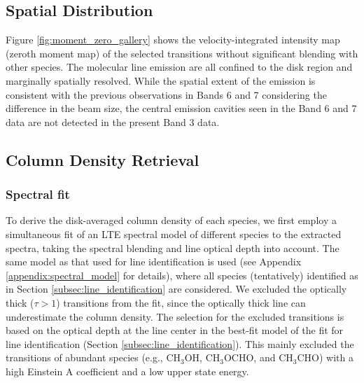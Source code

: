 \documentclass[linenumbers, twocolumn, twocolappendix, astrosymb, times]{aastex631}
\newcommand{\methanol}{CH$_3$OH\xspace}
\newcommand{\acetaldehyde}{CH$_3$CHO\xspace}
\newcommand{\methylformate}{CH$_3$OCHO\xspace}
\begin{document}



\subsection{Spatial Distribution}
Figure \ref{fig:moment_zero_gallery} shows the velocity-integrated intensity map (zeroth moment map) of the selected transitions without significant blending with other species. The molecular line emission are all confined to the disk region and marginally spatially resolved. While the spatial extent of the emission is consistent with the previous observations in Bands 6 and 7 \citep{vantHoff2018, Lee2019, Tobin2023} considering the difference in the beam size, the central emission cavities seen in the Band 6 and 7 data are not detected in the present Band 3 data. 


\subsection{Column Density Retrieval}
\subsubsection{Spectral fit}\label{subsubsec:spectral_fit}
To derive the disk-averaged column density of each species, we first employ a simultaneous fit of an LTE spectral model of different species to the extracted spectra, taking the spectral blending and line optical depth into account. The same model as that used for line identification is used (see Appendix \ref{appendix:spectral_model} for details), where all species (tentatively) identified as in Section \ref{subsec:line_identification} are considered. We excluded the optically thick ($\tau > 1$) transitions from the fit, since the optically thick line can underestimate the column density. The selection for the excluded transitions is based on the optical depth at the line center in the best-fit model of the fit for line identification (Section \ref{subsec:line_identification}). This mainly excluded the transitions of abundant species (e.g., \methanol, \methylformate, and \acetaldehyde) with a high Einstein A coefficient and a low upper state energy. 
\end{document}
